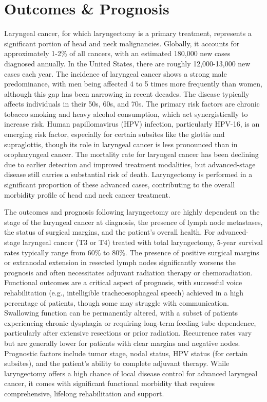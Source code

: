 \section*{Outcomes \& Prognosis}
Laryngeal cancer, for which laryngectomy is a primary treatment, represents a significant portion of head and neck malignancies. Globally, it accounts for approximately 1-2\% of all cancers, with an estimated 180,000 new cases diagnosed annually. In the United States, there are roughly 12,000-13,000 new cases each year. The incidence of laryngeal cancer shows a strong male predominance, with men being affected 4 to 5 times more frequently than women, although this gap has been narrowing in recent decades. The disease typically affects individuals in their 50s, 60s, and 70s. The primary risk factors are chronic tobacco smoking and heavy alcohol consumption, which act synergistically to increase risk. Human papillomavirus (HPV) infection, particularly HPV-16, is an emerging risk factor, especially for certain subsites like the glottis and supraglottis, though its role in laryngeal cancer is less pronounced than in oropharyngeal cancer. The mortality rate for laryngeal cancer has been declining due to earlier detection and improved treatment modalities, but advanced-stage disease still carries a substantial risk of death. Laryngectomy is performed in a significant proportion of these advanced cases, contributing to the overall morbidity profile of head and neck cancer treatment.

The outcomes and prognosis following laryngectomy are highly dependent on the stage of the laryngeal cancer at diagnosis, the presence of lymph node metastases, the status of surgical margins, and the patient's overall health. For advanced-stage laryngeal cancer (T3 or T4) treated with total laryngectomy, 5-year survival rates typically range from 60\% to 80\%. The presence of positive surgical margins or extranodal extension in resected lymph nodes significantly worsens the prognosis and often necessitates adjuvant radiation therapy or chemoradiation. Functional outcomes are a critical aspect of prognosis, with successful voice rehabilitation (e.g., intelligible tracheoesophageal speech) achieved in a high percentage of patients, though some may struggle with communication. Swallowing function can be permanently altered, with a subset of patients experiencing chronic dysphagia or requiring long-term feeding tube dependence, particularly after extensive resections or prior radiation. Recurrence rates vary but are generally lower for patients with clear margins and negative nodes. Prognostic factors include tumor stage, nodal status, HPV status (for certain subsites), and the patient's ability to complete adjuvant therapy. While laryngectomy offers a high chance of local disease control for advanced laryngeal cancer, it comes with significant functional morbidity that requires comprehensive, lifelong rehabilitation and support.

